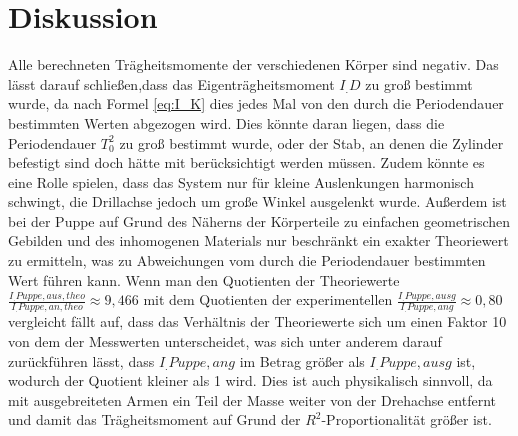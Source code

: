 \section{Diskussion}
\label{sec:Diskussion}
Alle berechneten Trägheitsmomente der verschiedenen Körper sind negativ.
Das lässt darauf schließen,dass das Eigenträgheitsmoment $I_.D$ zu groß bestimmt wurde, da nach Formel \eqref{eq:I_K} dies jedes Mal von den durch die Periodendauer bestimmten Werten abgezogen wird.\newline
Dies könnte daran liegen, dass die Periodendauer $T_0^2$ zu groß bestimmt wurde, oder der Stab, an denen die Zylinder befestigt sind doch hätte mit berücksichtigt werden müssen. Zudem könnte es eine Rolle spielen, dass das System nur für kleine Auslenkungen harmonisch schwingt, die Drillachse jedoch um große Winkel ausgelenkt wurde.\newline
Außerdem ist bei der Puppe auf Grund des Näherns der Körperteile zu einfachen geometrischen Gebilden und des inhomogenen Materials nur beschränkt ein exakter Theoriewert zu ermitteln, was zu Abweichungen vom durch die Periodendauer bestimmten Wert führen kann.
Wenn man den Quotienten der Theoriewerte $\frac{I_.{Puppe,aus,theo}}{I_.{Puppe,an,theo}}\approx 9,466$
mit dem Quotienten der experimentellen $\frac{I_.{Puppe,ausg}}{I_.{Puppe,ang}}\approx 0,80$
vergleicht fällt auf, dass das Verhältnis der Theoriewerte sich um einen Faktor 10 von dem der Messwerten unterscheidet, was sich unter anderem darauf zurückführen lässt, dass $I_.{Puppe,ang}$ im Betrag größer als $I_.{Puppe,ausg}$ ist, wodurch der Quotient kleiner als 1 wird. Dies ist auch physikalisch sinnvoll, da mit ausgebreiteten Armen ein Teil der Masse weiter von der Drehachse entfernt und damit das Trägheitsmoment auf Grund der $R^2$-Proportionalität größer ist.